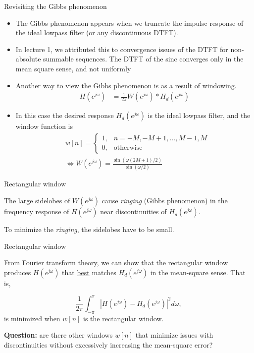 \documentclass[10pt, handout]{beamer}
\begin{document}
\begin{frame}{Revisiting the Gibbs phenomenon}
\begin{itemize}
	\item The Gibbs phenomenon appears when we truncate the impulse response of the ideal lowpass filter (or any discontinuous DTFT). 
	\item In lecture 1, we attributed this to convergence issues of the DTFT for non-absolute summable sequences. The DTFT of the sinc converges only in the mean square sense, and not uniformly
	\item Another way to view the Gibbs phenomenon is as a result of windowing.
\begin{align*}
H(e^{j\omega}) &= \frac{1}{2\pi}W(e^{j\omega}) \ast H_d(e^{j\omega}) \tag{convolution}
\end{align*}
	\item In this case the desired response $H_d(e^{j\omega})$ is the ideal lowpass filter, and the window function is
	\begin{align*}
	&w[n] = \begin{cases}
	1, & n = -M, -M+1, \ldots, M-1, M \\
	0, & \text{otherwise} 
	\end{cases} \\
	&\Longleftrightarrow W(e^{j\omega}) = \frac{\sin(\omega(2M+1)/2)}{\sin(\omega/2)}
	\end{align*}
\end{itemize}
\end{frame}

\begin{frame}{Rectangular window}
\begin{center}
	\resizebox{0.6\linewidth}{!}{}
\end{center}

The large sidelobes of $W(e^{j\omega})$ cause \textit{ringing} (Gibbs phenomenon) in the frequency response of $H(e^{j\omega})$ near discontinuities of $H_d(e^{j\omega})$.

To minimize the \textit{ringing}, the sidelobes have to be small. 
\end{frame}

\begin{frame}{Rectangular window}

From Fourier transform theory, we can show that the rectangular window produces $H(e^{j\omega})$ that \underline{best} matches $H_d(e^{j\omega})$ in the mean-square sense. That is,

\begin{equation*}
\frac{1}{2\pi}\int_{-\pi}^{\pi}|H(e^{j\omega}) - H_d(e^{j\omega})|^2d\omega, \tag{mean-square error}
\end{equation*}
is \underline{minimized} when $w[n]$ is the rectangular window.

\textbf{Question:} are there other windows $w[n]$ that minimize issues with discontinuities without excessively increasing the mean-square error?
\end{frame}
\end{document}

